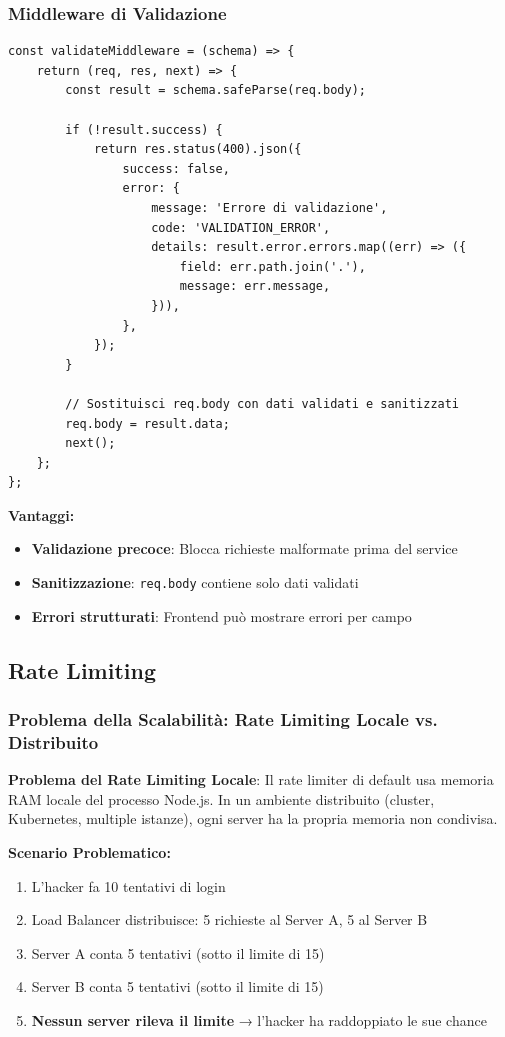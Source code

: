 \documentclass[11pt,a4paper]{article}
\newcommand{\code}[1]{\texttt{#1}}
\newcommand{\important}[1]{\textcolor{red!80!black}{\textbf{#1}}}
\begin{document}
\subsubsection{Middleware di Validazione}

\begin{lstlisting}[caption=Middleware Validazione Zod]
const validateMiddleware = (schema) => {
    return (req, res, next) => {
        const result = schema.safeParse(req.body);
        
        if (!result.success) {
            return res.status(400).json({
                success: false,
                error: {
                    message: 'Errore di validazione',
                    code: 'VALIDATION_ERROR',
                    details: result.error.errors.map((err) => ({
                        field: err.path.join('.'),
                        message: err.message,
                    })),
                },
            });
        }
        
        // Sostituisci req.body con dati validati e sanitizzati
        req.body = result.data;
        next();
    };
};
\end{lstlisting}

\textbf{Vantaggi:}
\begin{itemize}
    \item \textbf{Validazione precoce}: Blocca richieste malformate prima del service
    \item \textbf{Sanitizzazione}: \code{req.body} contiene solo dati validati
    \item \textbf{Errori strutturati}: Frontend può mostrare errori per campo
\end{itemize}

\subsection{Rate Limiting}

\subsubsection{Problema della Scalabilità: Rate Limiting Locale vs. Distribuito}

\important{Problema del Rate Limiting Locale}: Il rate limiter di default usa memoria RAM locale del processo Node.js. In un ambiente distribuito (cluster, Kubernetes, multiple istanze), ogni server ha la propria memoria non condivisa.

\textbf{Scenario Problematico:}
\begin{enumerate}
    \item L'hacker fa 10 tentativi di login
    \item Load Balancer distribuisce: 5 richieste al Server A, 5 al Server B
    \item Server A conta 5 tentativi (sotto il limite di 15)
    \item Server B conta 5 tentativi (sotto il limite di 15)
    \item \important{Nessun server rileva il limite} → l'hacker ha raddoppiato le sue chance
\end{enumerate}
\end{document}
